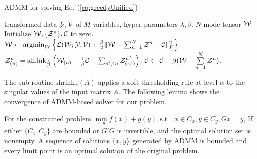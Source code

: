 \begin{algorithm}[h]
 \caption{ADMM for solving Eq. (\ref{eq:greedyUnified})}
 \label{alg:ADMM}
\begin{algorithmic}[1]
   transformed data ${\mathcal Y}, {\mathcal V}$ of $M$ variables, hyper-parameters $\lambda,\beta$.
    $N$ mode tensor ${\mathcal W}$ 
   \STATE Initialize ${\mathcal W}, \{{\mathcal Z}^{n}\}, {\mathcal C}$ to zero.
   \REPEAT
   \STATE ${\mathcal W} \leftarrow   \operatorname*{argmin}_{{\mathcal W}}\left\{\mathcal{L}({\mathcal W};{\mathcal Y}, {\mathcal V} ) +\frac{\beta}{2}\|{\mathcal W} - \sum_{n=1}^{N}{\mathcal Z}^{n} - {\mathcal C}  \|_F^2 \right\}$.
   \REPEAT
   \STATE ${\mathcal Z}^n_{(n)} = \mathrm{shrink}_{\frac{\lambda}{\beta}}\left( {\mathcal W}_{(n)}-\frac{1}{\beta}{\mathcal C} - \sum_{n'\neq n} {\mathcal Z}^{n'}_{(n')}  \right)$.
   \ENDFOR
   \STATE $\mathcal{C} \leftarrow  \mathcal{C}-\beta(\mathcal{{\mathcal W}}- \sum\limits_{n=1}^N {\mathcal Z}^{n})$.
   
\end{algorithmic}
\end{algorithm}


The sub-routine $\mathrm{shrink}_{\alpha} (A) $ applies a soft-thresholding rule at level $\alpha$ to the singular values of the input matrix  $A$. The following lemma shows the convergence of ADMM-based solver for our problem.

\begin{lemma} \cite{bertsekas1989parallel}
\label{lem:admm_opt}
For the constrained problem $\min\limits_{x,y} f(x)+g(y), \mathrm{s.t} \quad x \in C_x, y\in C_y, Gx=y$, If either $\{C_x, C_y\}$ are bounded or $G'G$ is invertible, and the optimal solution set is nonempty. A sequence of solutions $\{x, y\}$ generated by ADMM is bounded and every limit point is an optimal solution of the original problem.
\end{lemma}


